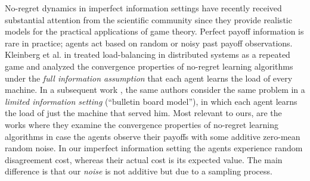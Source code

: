 No-regret dynamics in imperfect information settings have recently received substantial attention
from the scientific community since they provide realistic models for the
practical applications of game theory.  Perfect payoff information is rare in
practice; agents act based on random or noisy past payoff observations.
Kleinberg et al. in \cite{KPT09} treated load-balancing in distributed systems
as a repeated game and analyzed the convergence properties of no-regret
learning algorithms under the \emph{full information assumption} that each
agent learns the load of every machine.  In a subsequent work \cite{KPT11}, the
same authors consider the same problem in a \emph{limited information setting}
(\enquote{bulletin board model}), in which each agent learns the load of just
the machine that served him. Most relevant to ours, are the works \cite{HCM17,MS17,BM17,CHM17}
where they examine the convergence properties of no-regret learning algorithms 
in case the agents observe their payoffs with some additive
zero-mean random noise. In our imperfect information setting the agents
experience random disagreement cost, whereas their actual cost is its
expected value. The main difference is that our \emph{noise} is not additive
but due to a sampling process. 